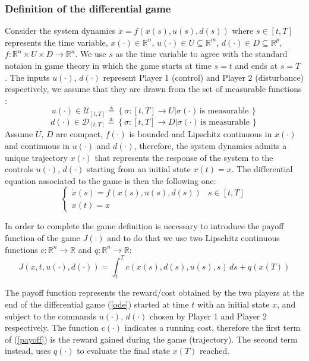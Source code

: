 \subsubsection{Definition of the differential game}
Consider the system dynamics $\dot{x}=f(x(s), u(s), d(s))$ where $s \in [t, T]$ represents the time variable, $x(\cdot)\in\mathbb{R}^n$, $u(\cdot)\in U\subseteq \mathbb{R}^m$, $d(\cdot)\in D\subseteq \mathbb{R}^p$, $f:\mathbb{R}^n \times U \times D \rightarrow \mathbb{R}^n$. We use $s$ as the time variable to agree with the standard notaion in game theory in which the game starts at time $s=t$ and ends at $s=T$ \cite{evans}.
The inputs $u(\cdot)$, $d(\cdot)$ represent Player 1 (control) and Player 2 (disturbance) respectively, we assume that they are drawn from the set of measurable functions \cite{evans}\cite{brief_intro}:
\[ 
    u(\cdot) \in \mathcal{U}_{[t, T]}  \triangleq 
    \left\{
        \sigma: [t, T] \rightarrow U| \sigma(\cdot) \, \textrm{is measurable} \, 
    \right\} 
\]
\[ 
    d(\cdot) \in \mathcal{D}_{[t, T]}  \triangleq 
    \left\{
        \sigma: [t, T] \rightarrow D| \sigma(\cdot) \, \textrm{is measurable} \, 
    \right\} 
\]
Assume $U$, $D$ are compact, $f(\cdot)$ is bounded and Lipschitz continuous in $x(\cdot)$ and continuous in $u(\cdot)$ and $d(\cdot)$, therefore, the system dynamics admits a unique trajectory $x(\cdot)$ that represents the response of the system to the controls $u(\cdot)$, $d(\cdot)$ starting from an initial state $x(t)=x$.
The differential equation associated to the game is then the following one:
\begin{equation}
	\label{ode}
	\left\{
		\begin{array}{ll}
			\dot{x}(s)=f(x(s), u(s), d(s))  & s \in [t, T] \\
			x(t) = x
		\end{array}
	\right.
\end{equation}

In order to complete the game definition is necessary to introduce the payoff function of the game $J(\cdot)$ and to do that we use two Lipschitz continuous functions $c:\mathbb{R}^n \rightarrow \mathbb{R}$ and $q:\mathbb{R}^n \rightarrow \mathbb{R}$:
\begin{equation}
	\label{payoff}
	J(x, t, u(\cdot), d(\cdot)) = \int_{t}^{T} c(x(s),d(s),u(s),s)  \,ds + q(x(T)) 
\end{equation}

The payoff function represents the reward/cost obtained by the two players at the end of the differential game (\ref{ode}) started at time $t$ with an initial state $x$, and subject to the commands  $u(\cdot)$, $d(\cdot)$ chosen by Player 1 and Player 2 respectively. The function $c(\cdot)$ indicates a running cost, therefore the first term of (\ref{payoff}) is the reward gained during the game (trajectory). The second term instead, uses $q(\cdot)$ to evaluate the final state $x(T)$ reached.
\newline

